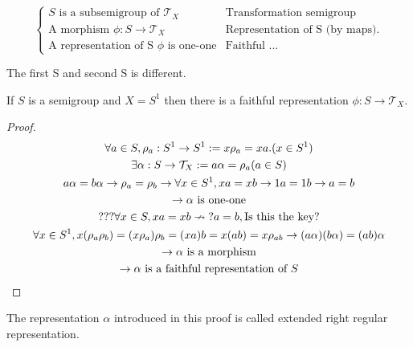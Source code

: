 \begin{Def}
    \[\begin{cases}
        S \text{ is a subsemigroup of }\mathcal{T}_X   &   \text{Transformation semigroup} \\
        \text{A morphism }\phi: S \rightarrow \mathcal{T}_X &   \text{Representation of S (by maps).}   \\
        \text{A representation of S }\phi \text{ is one-one} &  \text{Faithful ...}
    \end{cases}\]
    
    The first S and second S is different.
\end{Def}

\begin{Them}
    If $S$ is a semigroup and $X=S^1$ then there is a faithful representation $\phi:S \rightarrow \mathcal{T}_X$.
    \begin{proof}
        \begin{gather*}
            \forall a \in S, \rho_a : S^1\rightarrow S^1:= x\rho_a=xa. (x\in S^1)    \\
            \exists \alpha: S\rightarrow\mathcal{T}_X:=a\alpha=\rho_a(a\in S)   \\
            a\alpha=b\alpha \rightarrow \rho_a=\rho_b\rightarrow  \forall x \in S^1,xa=xb\rightarrow 1a=1b \rightarrow a=b  \\
            \rightarrow \alpha \text{\space is one-one} \\
            ??? \forall x\in S, xa=xb \nrightarrow{?} a=b, \text{Is this the key?} \\
            \forall x \in S^1,x(\rho_a\rho_b)=(x\rho_a)\rho_b=(xa)b=x(ab)=x\rho_{ab} \rightarrow (a\alpha)(b\alpha)=(ab)\alpha  \\
            \rightarrow \alpha \text{\space is a morphism}  \\
            \rightarrow \alpha \text{\space is a faithful representation of }S
        \end{gather*}
    \end{proof}

    The representation $\alpha$ introduced in this proof is called extended right regular representation.
\end{Them}


